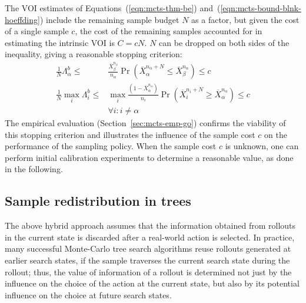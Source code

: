 The VOI estimates of Equations~(\ref{eqn:mcts-thm-be}) and~(\ref{eqn:mcts-bound-blnk-hoeffding})
include the remaining sample budget $N$ as a
factor, but given the cost of a single sample $c$, the cost of the
remaining samples accounted for in estimating the intrinsic VOI is
$C=cN$. $N$ can be dropped on both sides of the inequality,
giving a reasonable stopping criterion:
\begin{align}
\frac 1 N \Lambda_\alpha^b \le&\frac {\overline X_\beta^{n_\beta}}
  {n_\alpha}\Pr(\overline X_\alpha^{n_\alpha+N}\le\overline
  X_\beta^{n_\alpha})\le c\nonumber\\
\frac 1 N \max_i\Lambda_i^b\le &\max_i\frac {(1-\overline X_\alpha^{n_\alpha})} {n_i}\Pr(\overline
  X_i^{n_i+N}\ge\overline X_\alpha^{n_\alpha})\le c\nonumber\\
    &\forall i: i\ne\alpha
\label{eqn:mcts-stopping-blnk}
\end{align}
The empirical evaluation (Section~\ref{sec:mcts-emp-go})
confirms the viability of this stopping criterion and illustrates the
influence of the sample cost $c$ on the performance of
the sampling policy. When the sample cost $c$ is unknown, one can perform initial calibration experiments
to determine a reasonable value, as done in the following.

\subsection{Sample redistribution in trees}
\label{sec:mcts-control-redistribution}

The above hybrid approach assumes
that the information obtained from rollouts in the
current state is discarded after a real-world action is selected. In practice,
many successful Monte-Carlo tree search algorithms reuse rollouts
generated at earlier search states, if the sample traverses the
current search state during the rollout; thus, the value of information of a rollout is
determined not just by the influence on the choice of the action at
the current state, but also by its potential influence on the choice at future
search states.

